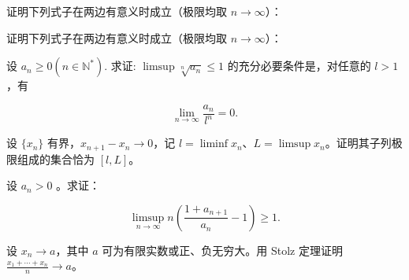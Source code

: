 \newpage
\noindent\begin{minipage}{\textwidth}
证明下列式子在两边有意义时成立（极限均取 $n\to\infty$）：
\end{minipage}\par\vfill
\noindent\begin{minipage}{\textwidth}
证明下列式子在两边有意义时成立（极限均取 $n\to\infty$）：
\end{minipage}\par\vfill
\noindent\begin{minipage}{\textwidth}
设  $ a_{n} \geqslant 0 (n \in \mathbb{N}^{*}) $. 求证:  $ \limsup\sqrt[n]{a_{n}} \leqslant 1 $ 的充分必要条件是，对任意的  $ l > 1 $，有

\[\lim_{n\to\infty}\frac{a_{n}}{l^{n}}=0.\]
\end{minipage}\par\vfill
\newpage
\noindent\begin{minipage}{\textwidth}
设 $\{x_n\}$ 有界，$x_{n+1}-x_n\to0$，记 $l=\liminf x_n$、$L=\limsup x_n$。证明其子列极限组成的集合恰为 $[l,L]$。
\end{minipage}\par\vfill
\noindent\begin{minipage}{\textwidth}
设  $ a_{n} > 0 $ 。求证：

\[\limsup_{n\to\infty}n\left(\frac{1+a_{n+1}}{a_{n}}-1\right)\geqslant1.\]
\end{minipage}\par\vfill
\noindent\begin{minipage}{\textwidth}
设 $x_n\to a$，其中 $a$ 可为有限实数或正、负无穷大。用 Stolz 定理证明 $\frac{x_1+\cdots+x_n}{n}\to a$。
\end{minipage}\par\vfill
